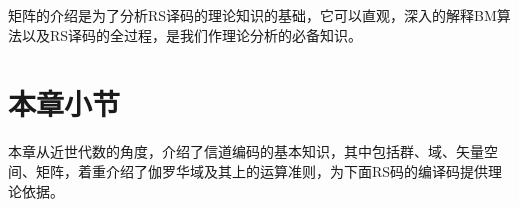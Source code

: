 矩阵的介绍是为了分析RS译码的理论知识的基础，它可以直观，深入的解释BM算法以及RS译码的全过程，是我们作理论分析的必备知识。

\section{本章小节}
本章从近世代数的角度，介绍了信道编码的基本知识，其中包括群、域、矢量空间、矩阵，着重介绍了伽罗华域及其上的运算准则，为下面RS码的编译码提供理论依据。
%

